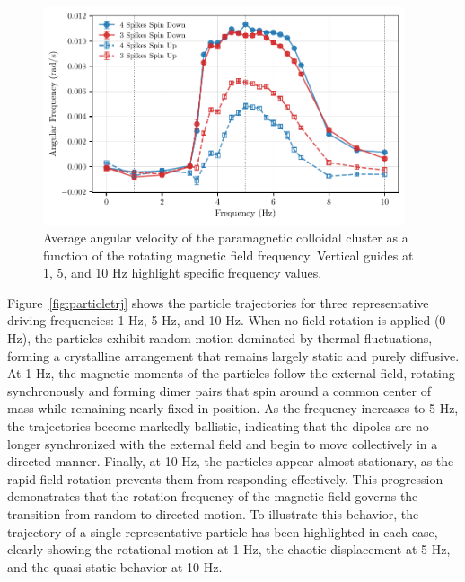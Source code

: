 \begin{figure}[h]
\begin{center}
\includegraphics[width=0.95\textwidth]{figures/AvsF.pdf}
\end{center}
\caption[Angular velocity as a function of driving frequency.]
{Average angular velocity of the paramagnetic colloidal cluster as a function of the rotating magnetic field frequency. Vertical guides at 1, 5, and 10 Hz highlight specific frequency values.}
\label{fig:angularvsfrequency}
\end{figure}

Figure~\ref{fig:particletrj} shows the particle trajectories for three representative driving frequencies: 1 Hz, 5 Hz, and 10 Hz. When no field rotation is applied (0 Hz), the particles exhibit random motion dominated by thermal fluctuations, forming a crystalline arrangement that remains largely static and purely diffusive.
At 1 Hz, the magnetic moments of the particles follow the external field, rotating synchronously and forming dimer pairs that spin around a common center of mass while remaining nearly fixed in position. As the frequency increases to 5 Hz, the trajectories become markedly ballistic, indicating that the dipoles are no longer synchronized with the external field and begin to move collectively in a directed manner. Finally, at 10 Hz, the particles appear almost stationary, as the rapid field rotation prevents them from responding effectively.
This progression demonstrates that the rotation frequency of the magnetic field governs the transition from random to directed motion. To illustrate this behavior, the trajectory of a single representative particle has been highlighted in each case, clearly showing the rotational motion at 1 Hz, the chaotic displacement at 5 Hz, and the quasi-static behavior at 10 Hz.

